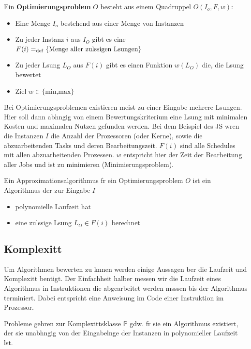 \documentclass[12pt, a4paper, twoside]{scrartcl}
\begin{document}
\begin{definition}
	[Optimierungsproblem] Ein \textbf{Optimierungsproblem} $O$ besteht aus einem Quadruppel $O(I_{o},F,w)$: 
	\begin{itemize}
		\item Eine Menge $I_{o}$ bestehend aus einer Menge von Instanzen 
		\item Zu jeder Instanz $i$ aus $I_O$ gibt es eine $F(i)=_{\mathrm{def}}\{\text{Menge \allowbreak aller \allowbreak zulssigen Lsungen}\}$ 
		\item Zu jeder Lsung $L_O$ aus $F(i)$ gibt es einen Funktion $w(L_O)$ die, die Lsung bewertet
		\item Ziel $w \in \{\text{min,max}\}$
	\end{itemize}
\end{definition}
Bei Optimierungsproblemen existieren meist zu einer Eingabe mehrere Lsungen. Hier soll dann abhngig von einem Bewertungskriterium eine Lsung mit minimalen Kosten und maximalen Nutzen gefunden werden.
Bei dem Beispiel des \ac{JS} wren die Instanzen $I$ die Anzahl der Prozessoren (oder Kerne), sowie die abzuarbeitenden Tasks und deren Bearbeitungszeit. $F(i)$ sind alle Schedules mit allen abzuarbeitenden Prozessen. $w$ entspricht hier der Zeit der Bearbeitung aller Jobs und ist zu minimieren (Minimierungsproblem).
\begin{definition}
	[Approximationsalgorithmus] Ein Approximationsalgorithmus fr ein Optimierungsproblem $O$ ist ein Algorithmus der zur Eingabe $I$
	\begin{itemize}
		\item polynomielle Laufzeit hat
		\item eine zulssige Lsung $L_{O} \in F(i)$ berechnet
	\end{itemize}
\end{definition}

\subsection{Komplexitt} %
Um Algorithmen bewerten zu knnen werden einige Aussagen ber die Laufzeit und Komplexitt bentigt. Der Einfachheit halber messen wir die Laufzeit eines Algorithmus in Instruktionen die abgearbeitet werden msssen bis der Algorithmus terminiert. Dabei entspricht eine Anweisung im Code einer Instruktion im Prozessor. 
\begin{definition}
	 Probleme gehren zur Komplexittsklasse $\mathbb{P}$ gdw. fr sie ein Algorithmus existiert, der sie  unabhngig von der Eingabelnge der Instanzen in polynomieller Laufzeit lst. 
\end{definition}
\end{document}
